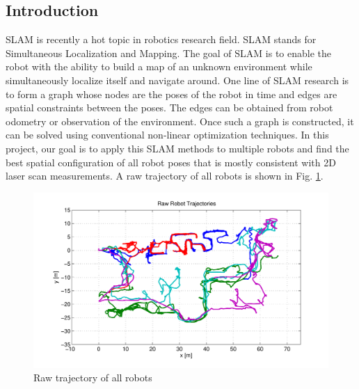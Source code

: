 \documentclass[twoside]{article}
\begin{document}
\begin{multicols}{2} %

\section{Introduction}
\lettrine[nindent=0em,lines=2]{S}LAM is recently a hot topic in robotics research field. SLAM stands for Simultaneous Localization and Mapping. The goal of SLAM is to enable the robot with the ability to build a map of an unknown environment while simultaneously localize itself and navigate around. One line of SLAM research is to form a graph whose nodes are the poses of the robot in time and edges are spatial constraints between the poses. The edges can be obtained from robot odometry or observation of the environment. Once such a graph is constructed, it can be solved using conventional non-linear optimization techniques. In this project, our goal is to apply this SLAM methods to multiple robots and find the best spatial configuration of all robot poses that is mostly consistent with 2D laser scan measurements. A raw trajectory of all robots is shown in Fig. \ref{fig:raw_traj}.

\begin{figure}[H]
\centering
\includegraphics[width=\columnwidth]{fig/raw_traj.pdf}
\caption{Raw trajectory of all robots}
\label{fig:raw_traj}
\end{figure}


\end{multicols}
\end{document}
